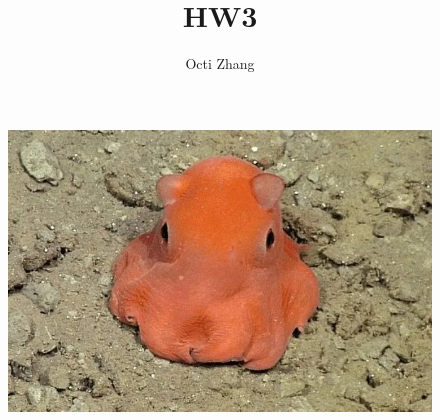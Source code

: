 \documentclass{article}
\title{HW3}
\author{Octi Zhang}
\begin{document}
\maketitle
\renewcommand{\abstractname}{OCTIPUS}
\begin{abstract}    
\end{abstract}
\begin{figure}[!h]
    \centering\includegraphics[width=0.5\linewidth]{octipus.jpg}
\end{figure}






\end{document}
